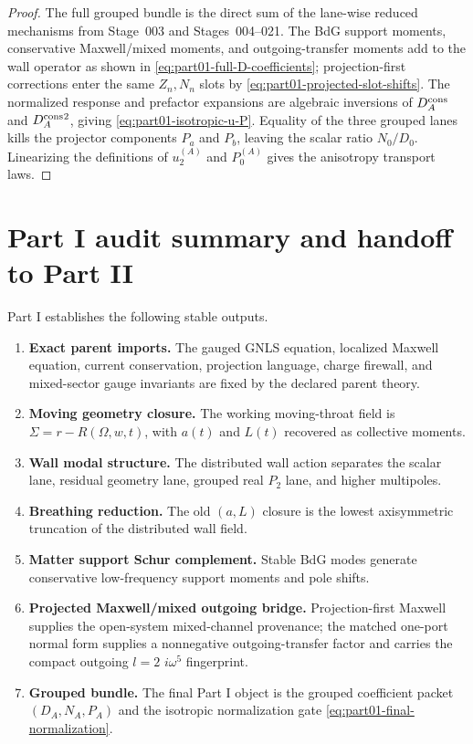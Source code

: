 \begin{proof}
The full grouped bundle is the direct sum of the lane-wise reduced mechanisms from Stage~003 and Stages~004--021.  The BdG support moments, conservative Maxwell/mixed moments, and outgoing-transfer moments add to the wall operator as shown in \eqref{eq:part01-full-D-coefficients}; projection-first corrections enter the same \(Z_n,N_n\) slots by \eqref{eq:part01-projected-slot-shifts}.  The normalized response and prefactor expansions are algebraic inversions of \(D_A^{\rm cons}\) and \(D_A^{\rm cons}{}^2\), giving \eqref{eq:part01-isotropic-u-P}.  Equality of the three grouped lanes kills the projector components \(P_a\) and \(P_b\), leaving the scalar ratio \(N_0/D_0\).  Linearizing the definitions of \(u_2^{(A)}\) and \(P_0^{(A)}\) gives the anisotropy transport laws.
\end{proof}

\section{Part I audit summary and handoff to Part II}
\label{sec:part01-audit-summary}

Part I establishes the following stable outputs.
\begin{enumerate}[leftmargin=2.2em]
  \item \textbf{Exact parent imports.}  The gauged GNLS equation, localized Maxwell equation, current conservation, projection language, charge firewall, and mixed-sector gauge invariants are fixed by the declared parent theory.
  \item \textbf{Moving geometry closure.}  The working moving-throat field is \(\Sigma=r-R(\Omega,w,t)\), with \(a(t)\) and \(L(t)\) recovered as collective moments.
  \item \textbf{Wall modal structure.}  The distributed wall action separates the scalar lane, residual geometry lane, grouped real \(P_2\) lane, and higher multipoles.
  \item \textbf{Breathing reduction.}  The old \((a,L)\) closure is the lowest axisymmetric truncation of the distributed wall field.
  \item \textbf{Matter support Schur complement.}  Stable BdG modes generate conservative low-frequency support moments and pole shifts.
  \item \textbf{Projected Maxwell/mixed outgoing bridge.}  Projection-first Maxwell supplies the open-system mixed-channel provenance; the matched one-port normal form supplies a nonnegative outgoing-transfer factor and carries the compact outgoing \(l=2\) \(i\omega^5\) fingerprint.
  \item \textbf{Grouped bundle.}  The final Part I object is the grouped coefficient packet \((D_A,N_A,P_A)\) and the isotropic normalization gate \eqref{eq:part01-final-normalization}.
\end{enumerate}

